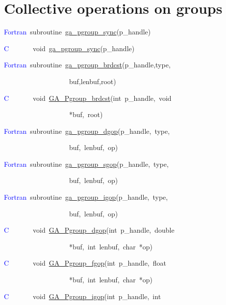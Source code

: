 \section{Collective operations on groups}
\textcolor{blue}{Fortran}~subroutine~\href{http://www.emsl.pnl.gov/docs/global/ga_ops.html\#GA_PGROUP_SYNC}{ga\_{}pgroup\_{}sync}(p\_handle)

\textcolor{blue}{C}~~~~~~~void~\href{http://www.emsl.pnl.gov/docs/global/ga_ops.html\#GA_PGROUP_SYNC}{ga\_{}pgroup\_{}sync}(p\_handle)

\textcolor{blue}{Fortran}~subroutine~\href{http://www.emsl.pnl.gov/docs/global/ga_ops.html\#GA_PGROUP_BRDCST}{ga\_{}pgroup\_{}brdcst}(p\_handle,type,

~~~~~~~~~~~~~~~~~~~buf,lenbuf,root)

\textcolor{blue}{C}~~~~~~~void~\href{http://www.emsl.pnl.gov/docs/global/ga_ops.html\#GA_PGROUP_BRDCST}{GA\_{}Pgroup\_{}brdcst}(int~p\_handle,~void~

~~~~~~~~~~~~~~~~~~~{*}buf,~root)

\textcolor{blue}{Fortran}~subroutine~\href{http://www.emsl.pnl.gov/docs/global/ga_ops.html\#GA_PGROUP_DGOP}{ga\_{}pgroup\_{}dgop}(p\_handle,~type,~

~~~~~~~~~~~~~~~~~~~buf,~lenbuf,~op)

\textcolor{blue}{Fortran}~subroutine~\href{http://www.emsl.pnl.gov/docs/global/ga_ops.html\#GA_PGROUP_SGOP}{ga\_{}pgroup\_{}sgop}(p\_handle,~type,~

~~~~~~~~~~~~~~~~~~~buf,~lenbuf,~op)

\textcolor{blue}{Fortran}~subroutine~\href{http://www.emsl.pnl.gov/docs/global/ga_ops.html\#GA_PGROUP_IGOP}{ga\_{}pgroup\_{}igop}(p\_handle,~type,~

~~~~~~~~~~~~~~~~~~~buf,~lenbuf,~op)

\textcolor{blue}{C}~~~~~~~void~\href{http://www.emsl.pnl.gov/docs/global/c_nga_ops.html\#GA_PGROUP_DGOP}{GA\_{}Pgroup\_{}dgop}(int~p\_handle,~double~

~~~~~~~~~~~~~~~~~~~{*}buf,~int~lenbuf,~char~{*}op)

\textcolor{blue}{C}~~~~~~~void~\href{http://www.emsl.pnl.gov/docs/global/c_nga_ops.html\#GA_PGROUP_FGOP}{GA\_{}Pgroup\_{}fgop}(int~p\_handle,~float~

~~~~~~~~~~~~~~~~~~~{*}buf,~int~lenbuf,~char~{*}op)

\textcolor{blue}{C}~~~~~~~void~\href{http://www.emsl.pnl.gov/docs/global/c_nga_ops.html\#GA_PGROUP_IGOP}{GA\_{}Pgroup\_{}igop}(int~p\_handle,~int~

